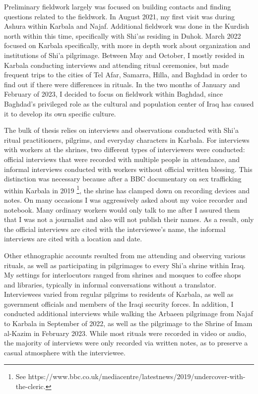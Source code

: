 Preliminary fieldwork largely was focused on building contacts and finding questions related to the fieldwork. In August 2021, my first visit was during Ashura within Karbala and Najaf. Additional fieldwork was done in the Kurdish north within this time, specifically with Shi'as residing in Duhok. March 2022 focused on Karbala specifically, with more in depth work about organization and institutions of Shi'a pilgrimage. Between May and October, I mostly resided in Karbala conducting interviews and attending ritual ceremonies, but made frequent trips to the cities of Tel Afar, Samarra, Hilla, and Baghdad in order to find out if there were differences in rituals. In the two months of January and February of 2023, I decided to focus on fieldwork within Baghdad, since Baghdad's privileged role as the cultural and population center of Iraq has caused it to develop its own specific culture. 

The bulk of thesis relies on interviews and observations conducted with Shi'a ritual practitioners, pilgrims, and everyday characters in Karbala. For interviews with workers at the shrines, two different types of interviewers were conducted: official interviews that were recorded with multiple people in attendance, and informal interviews conducted with workers without official written blessing. This distinction was necessary because after a BBC documentary on sex trafficking within Karbala in 2019 \footnote{See https://www.bbc.co.uk/mediacentre/latestnews/2019/undercover-with-the-cleric.}, the shrine has clamped down on recording devices and notes. On many occasions I was aggressively asked about my voice recorder and notebook. Many ordinary workers would only talk to me after I assured them that I was not a journalist and also will not publish their names. As a result, only the official interviews are cited with the interviewee's name, the informal interviews are cited with a location and date. 

Other ethnographic accounts resulted from me attending and observing various rituals, as well as participating in pilgrimages to every Shi'a shrine within Iraq. My settings for interlocutors ranged from shrines and mosques to coffee shops and libraries, typically in informal conversations without a translator. Interviewees varied from regular pilgrims to residents of Karbala, as well as government officials and members of the Iraqi security forces. In addition, I conducted additional interviews while walking the Arbaeen pilgrimage from Najaf to Karbala in September of 2022, as well as the pilgrimage to the Shrine of Imam al-Kazim in February 2023. While most rituals were recorded in video or audio, the majority of interviews were only recorded via written notes, as to preserve a casual atmosphere with the interviewee. 


